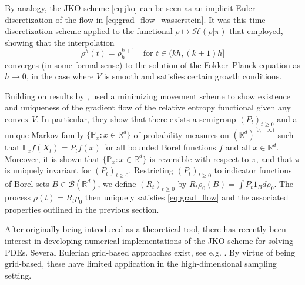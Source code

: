 \documentclass[final,12pt]{colt2018}
\begin{document}
By analogy, the JKO scheme \eqref{eq:jko} can be seen as an implicit Euler discretization of the flow in \eqref{eq:grad_flow_wasserstein}. It was this time discretization scheme applied to the functional $\rho \mapsto \mathcal{H}(\rho | \pi)$ that \citet{jordan1998variational} employed, showing that the interpolation 
\begin{equation}\label{eq:interpolation}
\rho^h(t) = \rho_h^{k+1} \quad \text{for $t \in (kh, (k+1)h]$}
\end{equation}
converges (in some formal sense) to the solution of the Fokker--Planck equation as $h \to 0$, in the case where $V$ is smooth and satisfies certain growth conditions. 

Building on results by \citet{cepa1998problame}, \citet{ambrosio2009existence} used a minimizing movement scheme to show existence and uniqueness of the gradient flow of the relative entropy functional given any convex $V$. In particular, they show that there exists a semigroup $(P_t)_{t\geq 0}$ and a unique Markov family $\{\mathbb{P}_x : x \in \mathbb{R}^d\}$ of probability measures on $(\mathbb{R}^d)^{[0,+\infty)}$ such that $\mathbb{E}_x f(X_t) = P_t f(x)$ for all bounded Borel functions $f$ and all $x \in\mathbb{R}^d$. Moreover, it is shown that $\{\mathbb{P}_x : x \in \mathbb{R}^d\}$ is reversible with respect to $\pi$, and that $\pi$ is uniquely invariant for $(P_t)_{t\geq 0}$. Restricting $(P_t)_{t\geq 0}$ to indicator functions of Borel sets $B \in \mathcal{B}(\mathbb{R}^d)$, we define $(R_t)_{t\geq 0}$ by $R_t \rho_0(B) = \int P_t 1_B d\rho_0$. The process $\rho(t) = R_t \rho_0$ then uniquely satisfies \eqref{eq:grad_flow} and the associated properties outlined in the previous section.

After originally being introduced as a theoretical tool, there has recently been interest in developing numerical implementations of the JKO scheme for solving PDEs. Several Eulerian grid-based approaches exist, see e.g. \citet{burger2012regularized,carrillo2015finite,peyre2015entropic}. By virtue of being grid-based, these have limited application in the high-dimensional sampling setting. 
\end{document}
